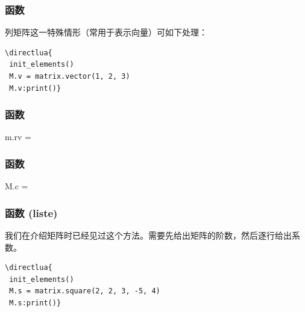 \subsubsection{函数 }
\label{ssub:method_vector}

列矩阵这一特殊情形（常用于表示向量）可如下处理：

\vspace{.5em}
\begin{minipage}{.5\textwidth}
\begin{verbatim}
\directlua{
 init_elements()
 M.v = matrix.vector(1, 2, 3)
 M.v:print()}
  \end{verbatim}
\end{minipage}
\begin{minipage}{.5\textwidth}
\end{minipage}

\subsubsection{函数 }
\label{ssub:function_row_vector}

\begin{mybox}

m.rv = 
\end{mybox}

\subsubsection{函数 }
\label{ssub:function_matrix_create_n_m}

\begin{mybox}

M.c = 
\end{mybox}

\subsubsection{函数 (liste)}
\label{ssub:method_square}

我们在介绍矩阵时已经见过这个方法。需要先给出矩阵的阶数，然后逐行给出系数。

\begin{minipage}{.5\textwidth}
\begin{verbatim}
\directlua{
 init_elements()
 M.s = matrix.square(2, 2, 3, -5, 4)
 M.s:print()}
\end{verbatim}
\end{minipage}
\begin{minipage}{.5\textwidth}
\end{minipage}

